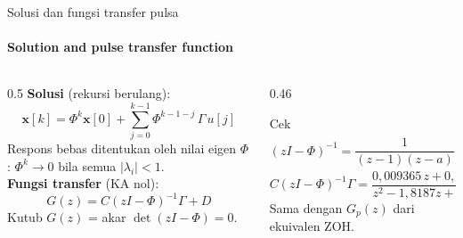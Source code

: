 \documentclass[aspectratio=169,10pt]{beamer}
\begin{document}
\begin{frame}{Solusi dan fungsi transfer pulsa}
	\framesubtitle{Solution and pulse transfer function}
	\begin{columns}[T]
		\begin{column}{0.5\textwidth}
			\small
			\textbf{Solusi} (rekursi berulang):
			\[
				\mathbf{x}[k] = \Phi^k\mathbf{x}[0] + \sum_{j=0}^{k-1}\Phi^{k-1-j}\,\Gamma\,u[j]
			\]
			Respons bebas ditentukan oleh nilai eigen $\Phi$: $\Phi^k \to 0$ bila semua $|\lambda_i| < 1$.\\[4pt]
			\textbf{Fungsi transfer} (KA nol):
			\[
				G(z) = C(zI - \Phi)^{-1}\Gamma + D
			\]
			Kutub $G(z)$ = akar $\det(zI-\Phi) = 0$.
		\end{column}
		\begin{column}{0.46\textwidth}
			\begin{exampleblock}{Cek}
				\small
				\[
					(zI-\Phi)^{-1} = \frac{1}{(z-1)(z-a)}\begin{bmatrix} z-a & \tau(1-a)\\ 0 & z-1\end{bmatrix}
				\]
				\[
					C(zI-\Phi)^{-1}\Gamma = \frac{0{,}009365\,z + 0{,}008762}{z^2 - 1{,}8187z + 0{,}8187}
				\]
				Sama dengan $G_p(z)$ dari ekuivalen ZOH. \checkmark
			\end{exampleblock}
		\end{column}
	\end{columns}
\end{frame}
\end{document}
